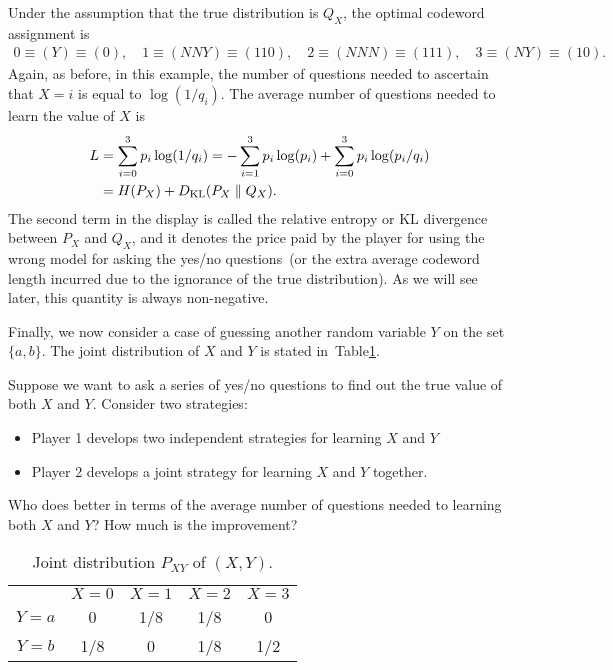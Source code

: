 \documentclass[12pt]{article}
\begin{document}
        Under the assumption that the true distribution is $Q_X$, the optimal codeword assignment is 
        \begin{align}
            0 \equiv (Y) \equiv (0), \quad 
            1 \equiv (NNY) \equiv (110), \quad 
            2 \equiv (NNN) \equiv (111), \quad 
            3 \equiv (NY) \equiv (10). 
        \end{align}
        Again, as before, in this example, the number of questions needed to ascertain that $X=i$ is equal to $\log(1/q_i)$. The average number of questions needed to learn the value of $X$ is 
        \begin{align}
            L &= \sum_{i=0}^3 p_i \log(1/q_i) = - \sum_{i=1}^3 p_i\log(p_i) +  \sum_{i=0}^3 p_i \log(p_i/q_i)  \\
            & = H(P_X) + D_{\text{KL}}(P_X \parallel Q_X). 
        \end{align}
        The second term in the display is called the relative entropy or KL divergence between $P_X$ and $Q_X$, and it denotes the price paid by the player for using the wrong model for asking the yes/no questions~(or the extra average codeword length incurred due to the ignorance of the true distribution). As we will see later, this quantity is always non-negative. 

        \begin{question}
            \label{question:guessing-game-IV} Finally, we now consider a case of guessing another random variable $Y$ on the set $\{a, b\}$. The joint distribution of $X$ and $Y$ is stated in~Table\ref{tab:joint-distribution}.  

            Suppose we want to ask a series of yes/no questions to find out the true value of both $X$ and $Y$. Consider two strategies: 
            \begin{itemize}
                \item Player 1 develops two  independent strategies for learning $X$ and $Y$ 
                \item Player 2 develops a joint strategy for learning $X$ and $Y$ together. 
            \end{itemize}
            Who does better in terms of the average number of questions needed to learning both $X$ and $Y$? How much is the improvement? 
        \end{question}
        \begin{table}
            \centering
            \begin{tabular}{|c|c|c|c|c|}
                \hline
                & $X=0$ & $X=1$ & $X=2$ & $X=3$  \\
            $Y=a$& 0 & 1/8 & 1/8 & 0 \\
            $Y=b$& 1/8 & 0 & 1/8 & 1/2  \\ 
            \hline 
            \end{tabular}
            \caption{Joint distribution $P_{XY}$ of $(X, Y)$.}
            \label{tab:joint-distribution}
        \end{table}
\end{document}
